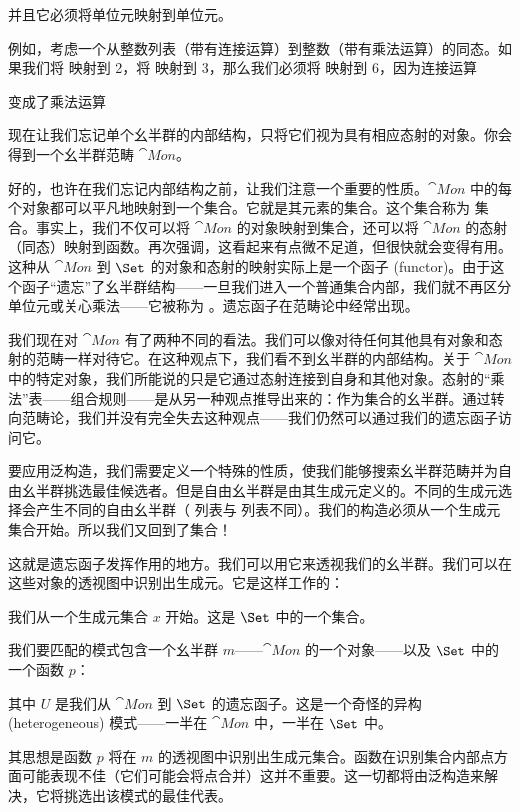 并且它必须将单位元映射到单位元。

例如，考虑一个从整数列表（带有连接运算）到整数（带有乘法运算）的同态。如果我们将 \code{{[}2{]}} 映射到 2，将 \code{{[}3{]}} 映射到 3，那么我们必须将 \code{{[}2, 3{]}} 映射到 6，因为连接运算

变成了乘法运算

现在让我们忘记单个幺半群的内部结构，只将它们视为具有相应态射的对象。你会得到一个幺半群范畴 $\cat{Mon}$。

好的，也许在我们忘记内部结构之前，让我们注意一个重要的性质。$\cat{Mon}$ 中的每个对象都可以平凡地映射到一个集合。它就是其元素的集合。这个集合称为  集合。事实上，我们不仅可以将 $\cat{Mon}$ 的对象映射到集合，还可以将 $\cat{Mon}$ 的态射（同态）映射到函数。再次强调，这看起来有点微不足道，但很快就会变得有用。这种从 $\cat{Mon}$ 到 $\Set$ 的对象和态射的映射实际上是一个函子 (functor)。由于这个函子“遗忘”了幺半群结构——一旦我们进入一个普通集合内部，我们就不再区分单位元或关心乘法——它被称为 。遗忘函子在范畴论中经常出现。

我们现在对 $\cat{Mon}$ 有了两种不同的看法。我们可以像对待任何其他具有对象和态射的范畴一样对待它。在这种观点下，我们看不到幺半群的内部结构。关于 $\cat{Mon}$ 中的特定对象，我们所能说的只是它通过态射连接到自身和其他对象。态射的“乘法”表——组合规则——是从另一种观点推导出来的：作为集合的幺半群。通过转向范畴论，我们并没有完全失去这种观点——我们仍然可以通过我们的遗忘函子访问它。

要应用泛构造，我们需要定义一个特殊的性质，使我们能够搜索幺半群范畴并为自由幺半群挑选最佳候选者。但是自由幺半群是由其生成元定义的。不同的生成元选择会产生不同的自由幺半群（ 列表与  列表不同）。我们的构造必须从一个生成元集合开始。所以我们又回到了集合！

这就是遗忘函子发挥作用的地方。我们可以用它来透视我们的幺半群。我们可以在这些对象的透视图中识别出生成元。它是这样工作的：

我们从一个生成元集合 $x$ 开始。这是 $\Set$ 中的一个集合。

我们要匹配的模式包含一个幺半群 $m$——$\cat{Mon}$ 的一个对象——以及 $\Set$ 中的一个函数 $p$：

其中 $U$ 是我们从 $\cat{Mon}$ 到 $\Set$ 的遗忘函子。这是一个奇怪的异构 (heterogeneous) 模式——一半在 $\cat{Mon}$ 中，一半在 $\Set$ 中。

其思想是函数 $p$ 将在 $m$ 的透视图中识别出生成元集合。函数在识别集合内部点方面可能表现不佳（它们可能会将点合并）这并不重要。这一切都将由泛构造来解决，它将挑选出该模式的最佳代表。

